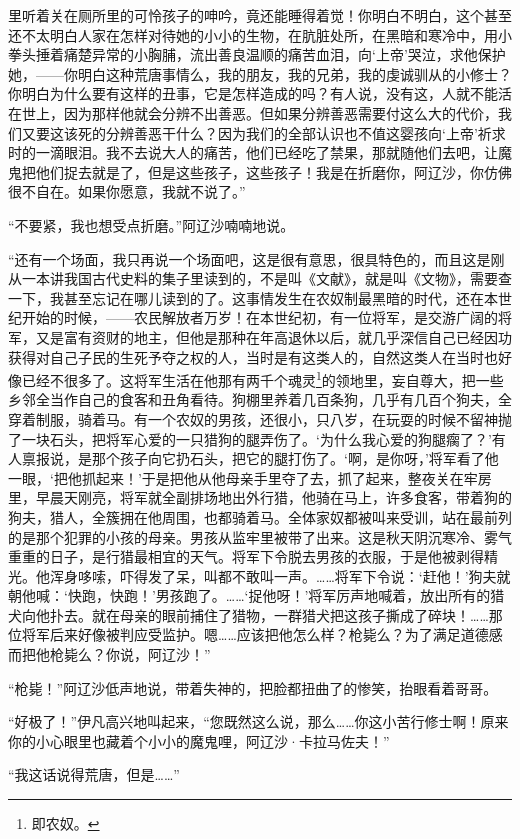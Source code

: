 里听着关在厕所里的可怜孩子的呻吟，竟还能睡得着觉！你明白不明白，这个甚至还不太明白人家在怎样对待她的小小的生物，在肮脏处所，在黑暗和寒冷中，用小拳头捶着痛楚异常的小胸脯，流出善良温顺的痛苦血泪，向‘上帝’哭泣，求他保护她，——你明白这种荒唐事情么，我的朋友，我的兄弟，我的虔诚驯从的小修士？你明白为什么要有这样的丑事，它是怎样造成的吗？有人说，没有这，人就不能活在世上，因为那样他就会分辨不出善恶。但如果分辨善恶需要付这么大的代价，我们又要这该死的分辨善恶干什么？因为我们的全部认识也不值这婴孩向‘上帝’祈求时的一滴眼泪。我不去说大人的痛苦，他们已经吃了禁果，那就随他们去吧，让魔鬼把他们捉去就是了，但是这些孩子，这些孩子！我是在折磨你，阿辽沙，你仿佛很不自在。如果你愿意，我就不说了。”
\par “不要紧，我也想受点折磨。”阿辽沙喃喃地说。
\par “还有一个场面，我只再说一个场面吧，这是很有意思，很具特色的，而且这是刚从一本讲我国古代史料的集子里读到的，不是叫《文献》，就是叫《文物》，需要查一下，我甚至忘记在哪儿读到的了。这事情发生在农奴制最黑暗的时代，还在本世纪开始的时候，——农民解放者万岁！在本世纪初，有一位将军，是交游广阔的将军，又是富有资财的地主，但他是那种在年高退休以后，就几乎深信自己已经因功获得对自己子民的生死予夺之权的人，当时是有这类人的，自然这类人在当时也好像已经不很多了。这将军生活在他那有两千个魂灵\footnote{即农奴。}的领地里，妄自尊大，把一些乡邻全当作自己的食客和丑角看待。狗棚里养着几百条狗，几乎有几百个狗夫，全穿着制服，骑着马。有一个农奴的男孩，还很小，只八岁，在玩耍的时候不留神抛了一块石头，把将军心爱的一只猎狗的腿弄伤了。‘为什么我心爱的狗腿瘸了？’有人禀报说，是那个孩子向它扔石头，把它的腿打伤了。‘啊，是你呀，’将军看了他一眼，‘把他抓起来！’于是把他从他母亲手里夺了去，抓了起来，整夜关在牢房里，早晨天刚亮，将军就全副排场地出外行猎，他骑在马上，许多食客，带着狗的狗夫，猎人，全簇拥在他周围，也都骑着马。全体家奴都被叫来受训，站在最前列的是那个犯罪的小孩的母亲。男孩从监牢里被带了出来。这是秋天阴沉寒冷、雾气重重的日子，是行猎最相宜的天气。将军下令脱去男孩的衣服，于是他被剥得精光。他浑身哆嗦，吓得发了呆，叫都不敢叫一声。……将军下令说：‘赶他！’狗夫就朝他喊：‘快跑，快跑！’男孩跑了。……‘捉他呀！’将军厉声地喊着，放出所有的猎犬向他扑去。就在母亲的眼前捕住了猎物，一群猎犬把这孩子撕成了碎块！……那位将军后来好像被判应受监护。嗯……应该把他怎么样？枪毙么？为了满足道德感而把他枪毙么？你说，阿辽沙！”
\par “枪毙！”阿辽沙低声地说，带着失神的，把脸都扭曲了的惨笑，抬眼看着哥哥。
\par “好极了！”伊凡高兴地叫起来，“您既然这么说，那么……你这小苦行修士啊！原来你的小心眼里也藏着个小小的魔鬼哩，阿辽沙·卡拉马佐夫！”
\par “我这话说得荒唐，但是……”

